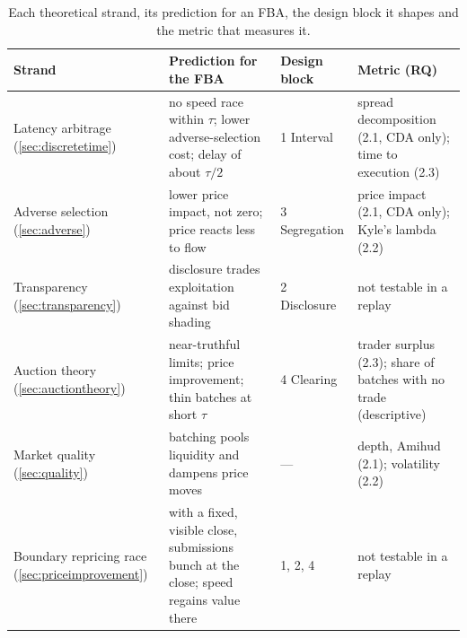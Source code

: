 \begin{table}[htbp]
\centering
\caption[From theory to design and measurement]{Each theoretical strand,
its prediction for an FBA, the design block it shapes and the metric that
measures it.}
\label{tab:theorylinks}
\small
\begin{tabularx}{\textwidth}{@{}p{2.6cm} L p{1.9cm} p{3.2cm}@{}}
\toprule
\textbf{Strand} & \textbf{Prediction for the FBA} & \textbf{Design block} & \textbf{Metric (RQ)}\\
\midrule
Latency arbitrage (\ref{sec:discretetime}) & no speed race within $\tau$; lower adverse-selection cost; delay of about $\tau/2$ & 1 Interval & spread decomposition (2.1, CDA only); time to execution (2.3)\\
Adverse selection (\ref{sec:adverse}) & lower price impact, not zero; price reacts less to flow & 3 Segregation & price impact (2.1, CDA only); Kyle's lambda (2.2)\\
Transparency (\ref{sec:transparency}) & disclosure trades exploitation against bid shading & 2 Disclosure & not testable in a replay\\
Auction theory (\ref{sec:auctiontheory}) & near-truthful limits; price improvement; thin batches at short $\tau$ & 4 Clearing & trader surplus (2.3); share of batches with no trade (descriptive)\\
Market quality (\ref{sec:quality}) & batching pools liquidity and dampens price moves & --- & depth, Amihud (2.1); volatility (2.2)\\
Boundary repricing race (\ref{sec:priceimprovement}) & with a fixed, visible close, submissions bunch at the close; speed regains value there & 1, 2, 4 & not testable in a replay\\
\bottomrule
\end{tabularx}
\end{table}
